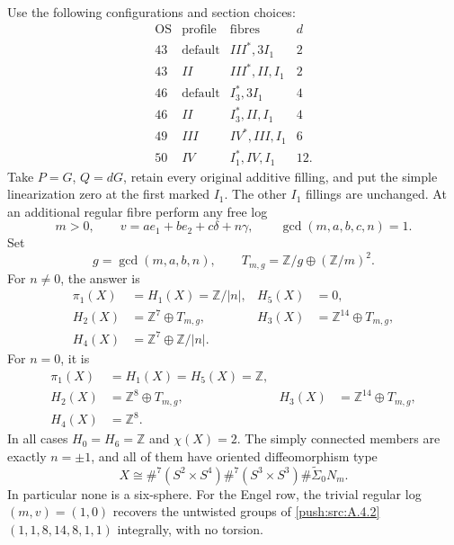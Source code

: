 \begin{theorem}
Use the following configurations and section choices:
\[
\begin{array}{c|c|l|r}
 \mathrm{OS}&\mathrm{profile}&\text{fibres}&d\\\hline
 43&\mathrm{default}&III^*,3I_1&2\\
 43&II&III^*,II,I_1&2\\
 46&\mathrm{default}&I_3^*,3I_1&4\\
 46&II&I_3^*,II,I_1&4\\
 49&III&IV^*,III,I_1&6\\
 50&IV&I_1^*,IV,I_1&12.
\end{array}
\]
Take $P=G$, $Q=dG$, retain every original additive filling,
and put the simple linearization zero at the first marked
$I_1$. The other $I_1$ fillings are unchanged. At an
additional regular fibre perform any free log
\[
 m>0,\qquad v=a e_1+b e_2+c\delta+n\gamma,
 \qquad\gcd(m,a,b,c,n)=1.
\]
Set
\[
        g=\gcd(m,a,b,n),\qquad
        T_{m,g}=\mathbb Z/g\oplus(\mathbb Z/m)^2.
\]
For $n\ne0$, the answer is
\[
\begin{aligned}
 \pi_1(X)&=H_1(X)=\mathbb Z/|n|, &H_5(X)&=0,\\
 H_2(X)&=\mathbb Z^7\oplus T_{m,g},
 &H_3(X)&=\mathbb Z^{14}\oplus T_{m,g},\\
 H_4(X)&=\mathbb Z^7\oplus\mathbb Z/|n|.
\end{aligned}
\tag{D.O1}\label{maps:eq:D.O1}
\]
For $n=0$, it is
\[
\begin{aligned}
 \pi_1(X)&=H_1(X)=H_5(X)=\mathbb Z,\\
 H_2(X)&=\mathbb Z^8\oplus T_{m,g},
 &H_3(X)&=\mathbb Z^{14}\oplus T_{m,g},\\
 H_4(X)&=\mathbb Z^8.
\end{aligned}
\tag{D.O2}\label{maps:eq:D.O2}
\]
In all cases $H_0=H_6=\mathbb Z$ and $\chi(X)=2$.
The simply connected members are exactly $n=\pm1$, and
all of them have oriented diffeomorphism type
\[
 X\cong\#^7(S^2\times S^4)\#^7(S^3\times S^3)
                                    \#\widetilde\Sigma_0N_m.
 \tag{D.O3}\label{maps:eq:D.O3}
\]
In particular none is a six-sphere. For the Engel row,
the trivial regular log $(m,v)=(1,0)$ recovers the
untwisted groups of \cref{push:src:A.4.2} $(1,1,8,14,8,1,1)$ integrally,
with no torsion.
\end{theorem}


